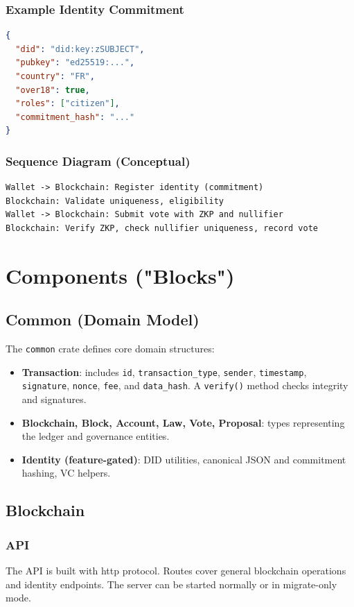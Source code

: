 \documentclass[12pt,a4paper]{report}
\begin{document}
\subsection{Example Identity Commitment}
\begin{lstlisting}[language=JSON,caption={Minimal Citizen Commitment}]
{
  "did": "did:key:zSUBJECT",
  "pubkey": "ed25519:...",
  "country": "FR",
  "over18": true,
  "roles": ["citizen"],
  "commitment_hash": "..."
}
\end{lstlisting}

\subsection{Sequence Diagram (Conceptual)}
\begin{verbatim}
Wallet -> Blockchain: Register identity (commitment)
Blockchain: Validate uniqueness, eligibility
Wallet -> Blockchain: Submit vote with ZKP and nullifier
Blockchain: Verify ZKP, check nullifier uniqueness, record vote
\end{verbatim}

\chapter{Components ("Blocks")}
\section{Common (Domain Model)}
The \texttt{common} crate defines core domain structures:
\begin{itemize}[noitemsep]
  \item \textbf{Transaction}: includes \texttt{id}, \texttt{transaction\_type}, \texttt{sender}, \texttt{timestamp}, \texttt{signature}, \texttt{nonce}, \texttt{fee}, and \texttt{data\_hash}. A \texttt{verify()} method checks integrity and signatures.
  \item \textbf{Blockchain, Block, Account, Law, Vote, Proposal}: types representing the ledger and governance entities.
  \item \textbf{Identity (feature-gated)}: DID utilities, canonical JSON and commitment hashing, VC helpers.
\end{itemize}

\section{Blockchain}

\subsection{API}
The API is built with http protocol. Routes cover general blockchain operations and identity endpoints. The server can be started normally or in migrate-only mode.
\end{document}

